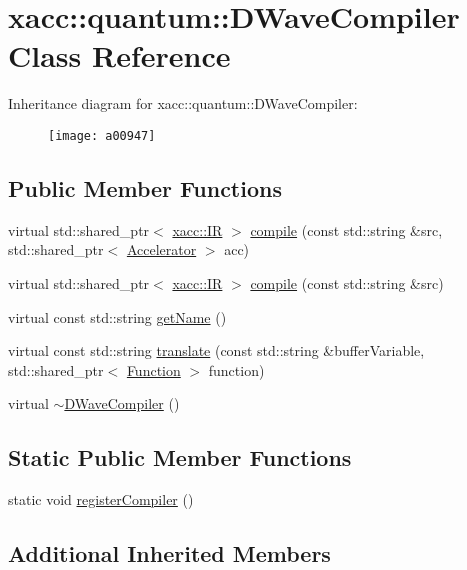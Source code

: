 \hypertarget{a00947}{}\section{xacc\+:\+:quantum\+:\+:D\+Wave\+Compiler Class Reference}
\label{a00947}
Inheritance diagram for xacc\+:\+:quantum\+:\+:D\+Wave\+Compiler\+:\begin{figure}[H]
\begin{center}
\leavevmode
\texttt{[image: a00947]}
\end{center}
\end{figure}
\subsection*{Public Member Functions}
\begin{DoxyCompactItemize}
\item 
virtual std\+::shared\+\_\+ptr$<$ \hyperlink{a01151}{xacc\+::\+IR} $>$ \hyperlink{a00947_a0f7f6b10b4a881cb27b36eaa6d39e7b1}{compile} (const std\+::string \&src, std\+::shared\+\_\+ptr$<$ \hyperlink{a01087}{Accelerator} $>$ acc)
\item 
virtual std\+::shared\+\_\+ptr$<$ \hyperlink{a01151}{xacc\+::\+IR} $>$ \hyperlink{a00947_a893e1d1c81a8aaf6e2435c9bceab575e}{compile} (const std\+::string \&src)
\item 
virtual const std\+::string \hyperlink{a00947_a8a180031ae563e1a9aac611e8066c181}{get\+Name} ()
\item 
virtual const std\+::string \hyperlink{a00947_a73a8839c55d22c68e5264feca8d626d4}{translate} (const std\+::string \&buffer\+Variable, std\+::shared\+\_\+ptr$<$ \hyperlink{a01127}{Function} $>$ function)
\item 
virtual \hyperlink{a00947_acc0ab28f787b8f4cbeb63c594a247e50}{$\sim$\+D\+Wave\+Compiler} ()
\end{DoxyCompactItemize}
\subsection*{Static Public Member Functions}
\begin{DoxyCompactItemize}
\item 
static void \hyperlink{a00947_a5b221649f22a9bb4d4a304a6522d071f}{register\+Compiler} ()
\end{DoxyCompactItemize}
\subsection*{Additional Inherited Members}


